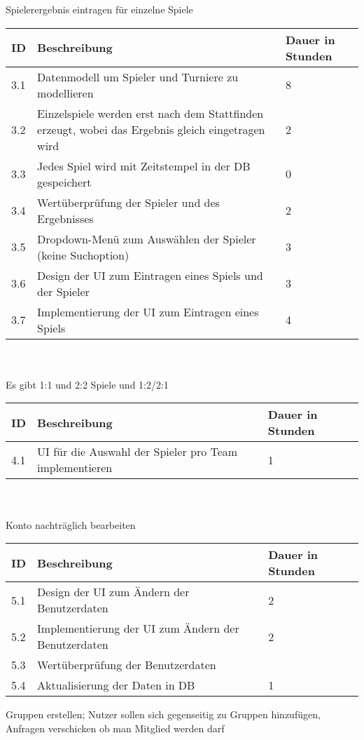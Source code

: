 Spielerergebnis eintragen für einzelne Spiele\\
\begin{tabular}[h]{|p{1cm}|p{10cm}|p{3cm}|}
\hline 
ID & Beschreibung & Dauer in Stunden \\ \hline 
3.1	& Datenmodell um Spieler und Turniere zu modellieren	& 8\\ \hline
3.2	& Einzelspiele werden erst nach dem Stattfinden erzeugt, wobei das Ergebnis gleich eingetragen wird & 2\\	 \hline
3.3	& Jedes Spiel wird mit Zeitstempel in der DB gespeichert & 0	\\ \hline
3.4	& Wertüberprüfung der Spieler und des Ergebnisses	& 2	\\ \hline
3.5	& Dropdown-Menü zum Auswählen der Spieler (keine Suchoption) & 3	\\ \hline
3.6	& Design der UI zum Eintragen eines Spiels und der Spieler & 3\\ \hline	3.7	& Implementierung der UI zum Eintragen eines Spiels & 4\\ \hline
\end{tabular}\\ \\
Es gibt 1:1 und 2:2 Spiele und 1:2/2:1\\
\begin{tabular}[h]{|p{1cm}|p{10cm}|p{3cm}|}
\hline 
ID & Beschreibung & Dauer in Stunden \\ \hline 
4.1 & UI für die Auswahl der Spieler pro Team implementieren	& 1 \\ \hline
\end{tabular}\\ \\
Konto nachträglich bearbeiten \\
\begin{tabular}[h]{|p{1cm}|p{10cm}|p{3cm}|}
\hline 
ID & Beschreibung & Dauer in Stunden \\ \hline 
5.1	& Design der UI zum Ändern der Benutzerdaten & 2 \\ \hline
5.2	& Implementierung der UI zum Ändern der Benutzerdaten & 2 \\ \hline	
5.3	 & Wertüberprüfung der Benutzerdaten & \\ \hline
5.4	 & Aktualisierung der Daten in DB & 1 \\ \hline
\end{tabular}\newpage
Gruppen erstellen; Nutzer sollen sich gegenseitig zu Gruppen hinzufügen, Anfragen verschicken ob man Mitglied werden darf \\

